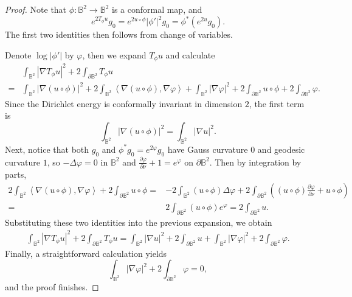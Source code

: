 \documentclass[11pt,a4paper,twoside]{amsart}
\newtheorem{sketch proof}{Sketch of the proof}[section]
\begin{document}
    \begin{proof}
        Note that $\phi:\mathbb{B}^2\to \mathbb{B}^2$ is a conformal map, and
        \[
        e^{2T_\phi u}g_0
        =e^{2u\circ\phi}|\phi'|^2g_0
        =\phi^*\left(e^{2u}g_0\right).
        \]
        The first two identities then follows from change of variables.

        Denote $\log|\phi'|$ by $\varphi$, then we expand $T_\phi u$ and calculate
        \[
\begin{aligned}
    &\int_{\mathbb{B}^2}
        |\nabla T_\phi u|^2
        +2\int_{\partial\mathbb{B}^2}T_\phi u
        \\
    =&
    \int_{\mathbb {B}^2}
    |\nabla(u\circ\phi)|^2
    +2\int_{\mathbb {B}^2}
        \left\langle \nabla(u\circ\phi),\nabla\varphi\right\rangle        
    +\int_{\mathbb {B}^2}
    |\nabla\varphi|^2
    +2\int_{\partial\mathbb{B}^2}u\circ\phi
    +2\int_{\partial\mathbb {B}^2}\varphi.
\end{aligned}
\]
Since the Dirichlet energy is conformally invariant in dimension \(2\), the first term is
\[
    \int_{\mathbb{B}^2}
    |\nabla(u\circ\phi)|^2
    =
    \int_{\mathbb{B}^2}|\nabla u|^2.
\]
Next, notice that both \(g_0\) and \(\phi^*g_0=e^{2\varphi}g_0\) have Gauss curvature \(0\) and geodesic curvature $1$, so $-\Delta \varphi=0$ in $\mathbb{B}^2$ and $\frac{\partial\varphi}{\partial\nu}+1=e^\varphi$ on $\partial\mathbb{B}^2$.
Then by integration by parts,
\[
\begin{aligned}
    2\int_{\mathbb{B}^2}
        \left\langle \nabla(u\circ\phi),\nabla\varphi
        \right\rangle 
        +2\int_{\partial\mathbb{B}^2}u\circ\phi
    =&-2\int_{\mathbb{B}^2}(u\circ\phi)\Delta\varphi
    +2\int_{\partial\mathbb{B}^2}
    \left((u\circ\phi)\frac{\partial\varphi}{\partial\nu}
    +u\circ\phi\right)\\
    =&2\int_{\partial\mathbb{B}^2}
    (u\circ\phi)    e^\varphi 
    =2\int_{\partial\mathbb{B}^2} u.
\end{aligned}
\]
Substituting these two identities into the previous expansion,  we obtain
\[
\begin{aligned}
    \int_{\mathbb{B}^2}
        |\nabla T_\phi u|^2
        +2\int_{\partial\mathbb{B}^2}T_\phi u
        =\int_{\mathbb{B}^2}|\nabla u|^2
         +2\int_{\partial\mathbb{B}^2}u 
         +\int_{\mathbb{B}^2}|\nabla\varphi|^2
         +2\int_{\partial\mathbb{B}^2}\varphi .
\end{aligned}
\]
    Finally, a straightforward calculation yields
    \[
    \int_{\mathbb{B}^2}|\nabla\varphi|^2
    +2\int_{\partial\mathbb{B}^2}\varphi 
    =0,
    \]
and the proof finishes.
    \end{proof}
\end{document}

